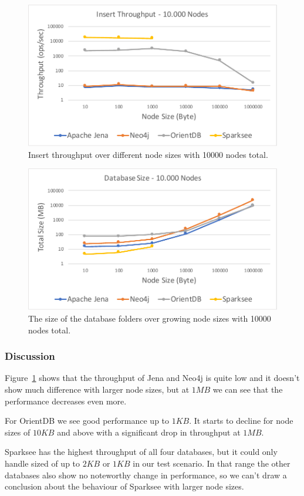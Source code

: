 \begin{figure}[h!]
  \centering
  \includegraphics[width=.75\textwidth]{images/throughput/nodeSize}
  \caption{Insert throughput over different node sizes with 10000 nodes total.}
  \label{fig:nodeSize}
\end{figure}

\begin{figure}[h!]
  \centering
  \includegraphics[width=.75\textwidth]{images/throughput/sizeDatabaseSize}
  \caption{The size of the database folders over growing node sizes with 10000 nodes total.}
  \label{fig:sizeDatabaseSize}
\end{figure}

\subsubsection{Discussion}
Figure~\ref{fig:nodeSize} shows that the throughput of Jena and Neo4j is quite low and it doesn't show much difference with larger node sizes,
but at $ 1MB $ we can see that the performance decreases even more.

For OrientDB we see good performance up to $ 1KB $.
It starts to decline for node sizes of $ 10KB $ and above with a significant drop in throughput at $ 1MB $.

Sparksee has the highest throughput of all four databases,
but it could only handle sized of up to $ 2KB $ or $ 1KB $ in our test scenario.
In that range the other databases also show no noteworthy change in performance,
so we can't draw a conclusion about the behaviour of Sparksee with larger node sizes.

